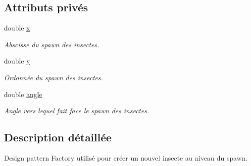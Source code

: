 \subsection*{Attributs privés}
\begin{DoxyCompactItemize}
\item 
double \hyperlink{classHatchery_ae56bf748a2046b42e2b174c17e4caeda}{x}
\begin{DoxyCompactList}\small\item\em Abscisse du spawn des insectes. \end{DoxyCompactList}\item 
double \hyperlink{classHatchery_a99f0ef4a290d0bc1e65976b5979b29b7}{y}
\begin{DoxyCompactList}\small\item\em Ordonnée du spawn des insectes. \end{DoxyCompactList}\item 
double \hyperlink{classHatchery_a4e56c9314b9a9dfe1718d43e30f3d4d0}{angle}
\begin{DoxyCompactList}\small\item\em Angle vers lequel fait face le spawn des insectes. \end{DoxyCompactList}\end{DoxyCompactItemize}


\subsection{Description détaillée}
Design pattern Factory utilisé pour créer un nouvel insecte au niveau du spawn. 


